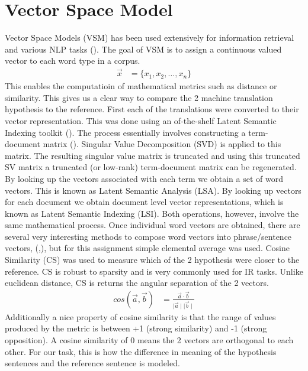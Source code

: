 \documentclass[11pt]{article}
\begin{document}
\section{Vector Space Model}
Vector Space Models (VSM) has been used extensively for information retrieval
and various NLP tasks (\cite{Manning:2008:IIR:1394399}). The goal of VSM is to
assign a continuous valued vector to each word type in a corpus.\\
\begin{align*}                                                                                                                                                                   
\vec{x} &= \{ x_1, x_2, \ldots, x_n\}
\end{align*}
 This enables the computatioin of mathematical metrics such as distance or
 similarity. This gives us a clear way to compare the 2 machine translation
 hypothesis to the reference. First each of the translations were converted to
 their vector representation. This was done using an of-the-shelf Latent
 Semantic Indexing toolkit (\cite{rehurek_lrec}). The process essentially
 involves constructing a term-document matrix (\cite{turney2010frequency}).
 Singular Value Decomposition (SVD) is applied to this matrix. The resulting singular value matrix is
 truncated and using this truncated SV matrix a truncated (or low-rank)
 term-document matrix can be regenerated. By looking up the vectors associated
 with each term we obtain a set of word vectors. This is known as Latent
 Semantic Analysis (LSA). By looking up vectors for each document we obtain
 document level vector representations, which is known as Latent Semantic
 Indexing (LSI). Both operations, however, involve the same mathematical
 process. Once individual word vectors are obtained, there are several very
 interesting methods to compose word vectors into phrase/sentence vectors,
 (\cite{hermann2013role},\cite{socher2012semantic}), but for this assignment
 simple elemental average was used. Cosine Similarity (CS) was used to measure which of the 2 hypothesis were closer to the reference. CS is robust to sparsity and is very commonly used for IR tasks. Unlike euclidean distance, CS is returns the angular separation of the 2 vectors.
 \begin{align*}
 cos(\vec{a},\vec{b}) &= \frac{\vec{a}\cdot \vec{b}}{\mid\vec{a}\mid
 \mid\vec{b}\mid}
 \end{align*}
 Additionally a nice property of cosine similarity is that the range of values
 produced by the metric is between +1 (strong similarity) and -1 (strong
 opposition). A cosine similarity of 0 means the 2 vectors are orthogonal to
 each other. For our task, this is how the difference in meaning of the
 hypothesis sentences and the reference sentence is modeled.
\end{document}
